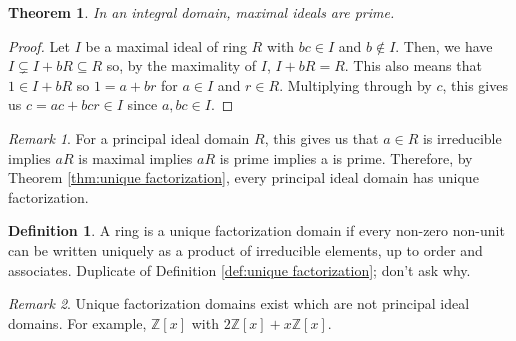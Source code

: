 \documentclass[11pt]{article}
\newtheorem{theorem}{Theorem}[definition]
\theoremstyle{definition}
\newtheorem{definition}{Definition}[section]
\theoremstyle{remark}
\newtheorem{remark}{Remark}[definition]
\begin{document}
\begin{theorem}
    In an integral domain, maximal ideals are prime.
\end{theorem}

\begin{proof}
    Let $I$ be a maximal ideal of ring $R$ with $bc\in I$ and $b\notin I$.
    Then, we have $I\subsetneq I+bR\subseteq R$ so, by the maximality of $I$,
    $I+bR=R$.
    This also means that $1\in I+bR$ so $1=a+br$ for $a\in I$ and $r\in R$.
    Multiplying through by $c$, this gives us $c=ac+bcr\in I$ since $a,bc\in I$.
\end{proof}

\begin{remark}
    For a principal ideal domain $R$, this gives us that $a\in R$ is
    irreducible implies $aR$ is maximal implies $aR$ is prime implies a is prime.
    Therefore, by Theorem \ref{thm:unique factorization}, every principal ideal
    domain has unique factorization.
\end{remark}

\begin{definition}
    A ring is a unique factorization domain if every non-zero non-unit can be
    written uniquely as a product of irreducible elements, up to order and
    associates.
    Duplicate of Definition \ref{def:unique factorization}; don't ask why.
\end{definition}

\begin{remark}
    Unique factorization domains exist which are not principal ideal domains.
    For example, $\mathbb{Z}[x]$ with $2\mathbb{Z}[x]+x\mathbb{Z}[x]$.
\end{remark}
\end{document}
